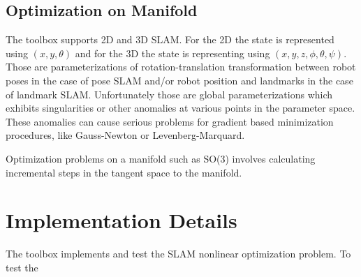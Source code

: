 \documentclass{article}
\begin{document}
{\subsection{Optimization on Manifold}\label{subsec:manifold}
The toolbox supports 2D and 3D SLAM. For the 2D the state is represented using $(x,y,\theta)$ and for the 3D the state is representing using $(x,y,z,\phi,\theta,\psi)$. Those are parameterizations of rotation-translation transformation between robot poses in the case of pose SLAM and/or robot position and landmarks in the case of landmark SLAM. Unfortunately those are global parameterizations  which exhibits singularities or other anomalies at various points in the parameter
space. These anomalies can cause serious problems for gradient based minimization procedures, like Gauss-Newton or Levenberg-Marquard.

Optimization problems on a manifold such as SO(3) involves calculating incremental steps in the tangent space to the manifold.

\section{Implementation Details}\label{subsec:Impl}
The toolbox implements and test the SLAM nonlinear optimization problem. To test the 
}
\end{document}
